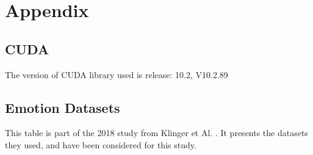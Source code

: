 \chapter{Appendix}\label{chap:Appendix}


\section{CUDA}\label{sec:CUDA}

The version of CUDA library used is release: 10.2, V10.2.89


\section{Emotion Datasets}\label{sec:Emotion Datasets}
This table is part of the 2018 study from Klinger et Al. \cite{klinger2018analysis}. It presents the datasets they used, and have been considered for this study.
